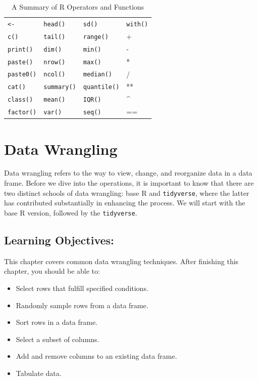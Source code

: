 \documentclass[
  letterpaper,
]{book}
\begin{document}
\begin{longtable}[]{@{}llll@{}}
\caption{A Summary of R Operators and Functions}\tabularnewline
\toprule\noalign{}
\endfirsthead
\endhead
\bottomrule\noalign{}
\endlastfoot
\texttt{\textless{}-} & \texttt{head()} & \texttt{sd()} &
\texttt{with()} \\
\texttt{c()} & \texttt{tail()} & \texttt{range()} & + \\
\texttt{print()} & \texttt{dim()} & \texttt{min()} & - \\
\texttt{paste()} & \texttt{nrow()} & \texttt{max()} & * \\
\texttt{paste0()} & \texttt{ncol()} & \texttt{median()} & / \\
\texttt{cat()} & \texttt{summary()} & \texttt{quantile()} & ** \\
\texttt{class()} & \texttt{mean()} & \texttt{IQR()} & \^{} \\
\texttt{factor()} & \texttt{var()} & \texttt{seq()} & == \\
\end{longtable}


\chapter{Data Wrangling}\label{data-wrangling}

Data wrangling refers to the way to view, change, and reorganize data in
a data frame. Before we dive into the operations, it is important to
know that there are two distinct schools of data wrangling: base R and
\texttt{tidyverse}, where the latter has contributed substantially in
enhancing the process. We will start with the base R version, followed
by the \texttt{tidyverse}.

\section*{Learning Objectives:}\label{learning-objectives-1}


This chapter covers common data wrangling techniques. After finishing
this chapter, you should be able to:

\begin{itemize}
\item
  Select rows that fulfill specified conditions.
\item
  Randomly sample rows from a data frame.
\item
  Sort rows in a data frame.
\item
  Select a subset of columns.
\item
  Add and remove columns to an existing data frame.
\item
  Tabulate data.
\end{itemize}
\end{document}
